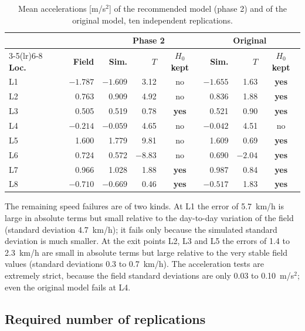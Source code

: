 \documentclass[11pt,a4paper]{article}
\newcommand{\pass}{\textcolor{okgreen}{\textbf{yes}}}
\newcommand{\fail}{\textcolor{failred}{no}}
\newcommand{\kmh}{~km/h}
\newcommand{\mss}{~m/s$^2$}
\begin{document}
\begin{table}[!htb]
\centering
\caption[Location-wise acceleration validation]{Mean accelerations [m/s$^2$] of the recommended
model (phase 2) and of the original model, ten independent replications.}
\label{tab:accval}
\small
\begin{tabular}{lrrrcrrc}
\toprule
& & \multicolumn{3}{c}{\textbf{Phase 2}} & \multicolumn{3}{c}{\textbf{Original}}\\
\cmidrule(lr){3-5}\cmidrule(lr){6-8}
\textbf{Loc.} & \textbf{Field} & \textbf{Sim.} & $T$ & \textbf{$H_0$ kept} & \textbf{Sim.} & $T$ & \textbf{$H_0$ kept}\\
\midrule
L1 & $-1.787$ & $-1.609$ &  3.12   & \fail & $-1.655$ &  1.63   & \pass\\
L2 &  0.763   &  0.909   &  4.92   & \fail &  0.836   &  1.88   & \pass\\
L3 &  0.505   &  0.519   &  0.78   & \pass &  0.521   &  0.90   & \pass\\
L4 & $-0.214$ & $-0.059$ &  4.65   & \fail & $-0.042$ &  4.51   & \fail\\
L5 &  1.600   &  1.779   &  9.81   & \fail &  1.609   &  0.69   & \pass\\
L6 &  0.724   &  0.572   & $-8.83$ & \fail &  0.690   & $-2.04$ & \pass\\
L7 &  0.966   &  1.028   &  1.88   & \pass &  0.987   &  0.84   & \pass\\
L8 & $-0.710$ & $-0.669$ &  0.46   & \pass & $-0.517$ &  1.83   & \pass\\
\bottomrule
\end{tabular}
\end{table}

The remaining speed failures are of two kinds. At L1 the error of 5.7\kmh{} is large in absolute
terms but small relative to the day-to-day variation of the field (standard deviation 4.7\kmh); it
fails only because the simulated standard deviation is much smaller. At the exit points L2, L3 and
L5 the errors of 1.4 to 2.3\kmh{} are small in absolute terms but large relative to the very stable
field values (standard deviations 0.3 to 0.7\kmh). The acceleration tests are extremely strict,
because the field standard deviations are only 0.03 to 0.10\mss; even the original model fails at
L4.

\subsection{Required number of replications}
\end{document}
